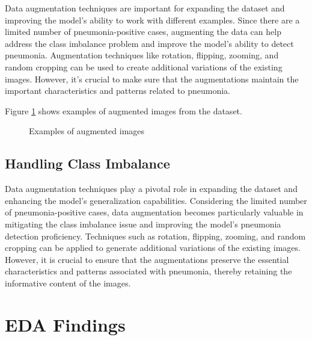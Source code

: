 \documentclass[9pt,twocolumn,twoside]{opticajnl}
\begin{document}
Data augmentation techniques are important for expanding the dataset and improving the model's ability to work with different examples. Since there are a limited number of pneumonia-positive cases, augmenting the data can help address the class imbalance problem and improve the model's ability to detect pneumonia. Augmentation techniques like rotation, flipping, zooming, and random cropping can be used to create additional variations of the existing images. However, it's crucial to make sure that the augmentations maintain the important characteristics and patterns related to pneumonia.


Figure \ref{fig:augmented-images} shows examples of augmented images from the dataset.

\begin{figure}[ht]
\centering
{}
\caption{Examples of augmented images}
\label{fig:augmented-images}
\end{figure}

\subsection{Handling Class Imbalance}

Data augmentation techniques play a pivotal role in expanding the dataset and enhancing the model's generalization capabilities. Considering the limited number of pneumonia-positive cases, data augmentation becomes particularly valuable in mitigating the class imbalance issue and improving the model's pneumonia detection proficiency. Techniques such as rotation, flipping, zooming, and random cropping can be applied to generate additional variations of the existing images. However, it is crucial to ensure that the augmentations preserve the essential characteristics and patterns associated with pneumonia, thereby retaining the informative content of the images.

\section{EDA Findings}
\end{document}
